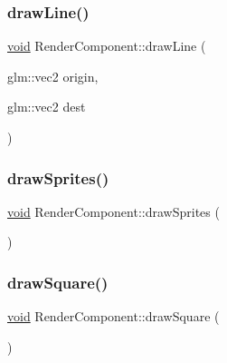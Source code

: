 \mbox{\label{classRenderComponent_ac38281dc68e53d796d44dfb7d4c588a4}} 
\subsubsection{\texorpdfstring{draw\+Line()}{drawLine()}\hspace{0.1cm}{\footnotesize\ttfamily [2/2]}}
{\footnotesize\ttfamily \hyperlink{imgui__impl__opengl3__loader_8h_ac668e7cffd9e2e9cfee428b9b2f34fa7}{void} Render\+Component\+::draw\+Line (\begin{DoxyParamCaption}\item[{glm\+::vec2}]{origin,  }\item[{glm\+::vec2}]{dest }\end{DoxyParamCaption})}

\mbox{\label{classRenderComponent_a8def1d9b9ceda298e79b82fd8b0e5942}} 
\subsubsection{\texorpdfstring{draw\+Sprites()}{drawSprites()}}
{\footnotesize\ttfamily \hyperlink{imgui__impl__opengl3__loader_8h_ac668e7cffd9e2e9cfee428b9b2f34fa7}{void} Render\+Component\+::draw\+Sprites (\begin{DoxyParamCaption}{ }\end{DoxyParamCaption})}

\mbox{\label{classRenderComponent_ab6c080155535c487e32403e4d22683e5}} 
\subsubsection{\texorpdfstring{draw\+Square()}{drawSquare()}}
{\footnotesize\ttfamily \hyperlink{imgui__impl__opengl3__loader_8h_ac668e7cffd9e2e9cfee428b9b2f34fa7}{void} Render\+Component\+::draw\+Square (\begin{DoxyParamCaption}{ }\end{DoxyParamCaption})}

